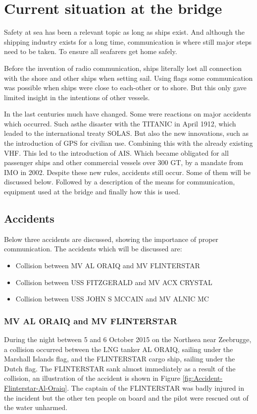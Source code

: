 \chapter{Current situation at the bridge}
Safety at sea has been a relevant topic as long as ships exist. And although the shipping industry exists for a long time, communication is where still major steps need to be taken. To ensure all seafarers get home safely.

Before the invention of radio communication, ships literally lost all connection with the shore and other ships when setting sail. Using flags some communication was possible when ships were close to each-other or to shore. But this only gave limited insight in the intentions of other vessels. 

In the last centuries much have changed. Some were reactions on major accidents which occurred. Such asthe disaster with the TITANIC in April 1912, which leaded to the international treaty \ac{SOLAS}. But also the new innovations, such as the introduction of \ac{GPS} for civilian use. Combining this with the already existing \ac{VHF}. This led to the introduction of \ac{AIS}. Which became obligated for all passenger ships and other commercial vessels over 300 \ac{GT}, by a mandate from \ac{IMO} in 2002.
Despite these new rules, accidents still occur. Some of them will be discussed below. Followed by a description of the means for communication, equipment used at the bridge and finally how this is used.

\section{Accidents}
Below three accidents are discussed, showing the importance of proper communication. The accidents which will be discussed are:
\begin{itemize}
	\item Collision between MV AL ORAIQ and MV FLINTERSTAR
	\item Collision between USS FITZGERALD and MV ACX CRYSTAL
	\item Collision between USS JOHN S MCCAIN and MV ALNIC MC
\end{itemize}

\newpage
\subsection{MV AL ORAIQ and MV FLINTERSTAR}
\label{sec:al-oraiq-vs-flinterstar}
During the night between 5 and 6 October 2015 on the Northsea near Zeebrugge, a collision occurred between the LNG tanker AL ORAIQ, sailing under the Marshall Islands flag, and the FLINTERSTAR cargo ship, sailing under the Dutch flag. The FLINTERSTAR sank almost immediately as a result of the collision, an illustration of the accident is shown in Figure \ref{fig:Accident-Flinterstar-Al-Oraiq}. The captain of the FLINTERSTAR was badly injured in the incident but the other ten people on board and the pilot were rescued out of the water unharmed.


